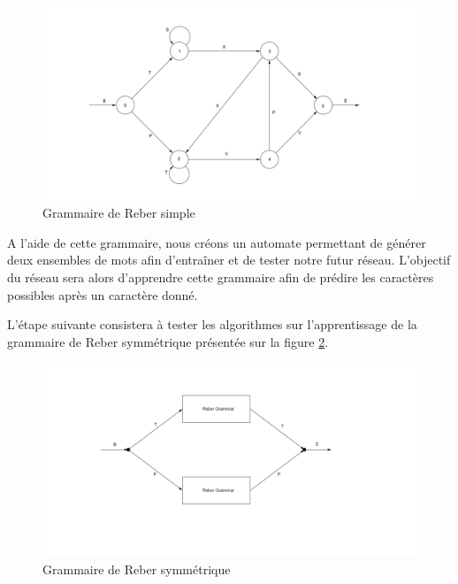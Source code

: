 \documentclass{report}
\begin{document}
\begin{figure}[h!]
\begin{center}
\includegraphics[scale=0.3]{images/reber_simple.png}
\caption{Grammaire de Reber simple}
\label{Grammaire de Reber simple}
\end{center}
\end{figure}

A l'aide de cette grammaire, nous créons un automate permettant de générer deux ensembles de mots afin d'entraîner et de tester notre futur réseau. L'objectif du réseau sera alors d'apprendre cette grammaire afin de prédire les caractères possibles après un caractère donné.

\bigbreak
L'étape suivante consistera à tester les algorithmes sur l'apprentissage de la grammaire de Reber symmétrique présentée sur la figure \ref{Grammaire de Reber symmétrique}.  
\begin{figure}[h!]
\begin{center}
\includegraphics[scale=0.5]{images/reber_symmetrique.png}
\caption{Grammaire de Reber symmétrique}
\label{Grammaire de Reber symmétrique}
\end{center}
\end{figure}
\end{document}
